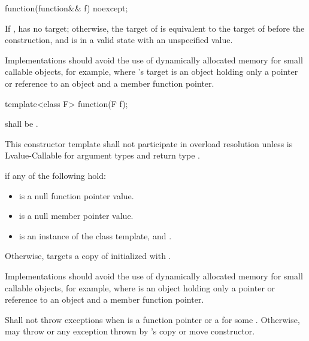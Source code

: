 %
\begin{itemdecl}
function(function&& f) noexcept;
\end{itemdecl}

\begin{itemdescr}
\pnum
\ensures If ,  has no target;
otherwise, the target of  is equivalent to
the target of  before the construction, and
 is in a valid state with an unspecified value.

\pnum
\begin{note} Implementations should avoid the use of
dynamically allocated memory for small callable objects, for example,
where 's target is an object holding only a pointer or reference
to an object and a member function pointer. \end{note}
\end{itemdescr}

%
\begin{itemdecl}
template<class F> function(F f);
\end{itemdecl}

\begin{itemdescr}
\pnum
\requires {} shall be .

\pnum
\remarks This constructor template shall not participate in overload resolution unless
 is Lvalue-Callable for argument types
 and return type .

\pnum
\ensures {} if any of the following hold:
\begin{itemize}
\item {} is a null function pointer value.
\item {} is a null member pointer value.
\item {} is an instance of the  class template, and
  .
\end{itemize}

\pnum
Otherwise,  targets a copy of 
initialized with .
\begin{note} Implementations should avoid the use of
dynamically allocated memory for small callable objects, for example,
where  is an object holding only a pointer or
reference to an object and a member function pointer. \end{note}

\pnum
\throws Shall not throw exceptions when  is a function pointer
or a  for some . Otherwise,
may throw  or any exception thrown by 's copy
or move constructor.
\end{itemdescr}


